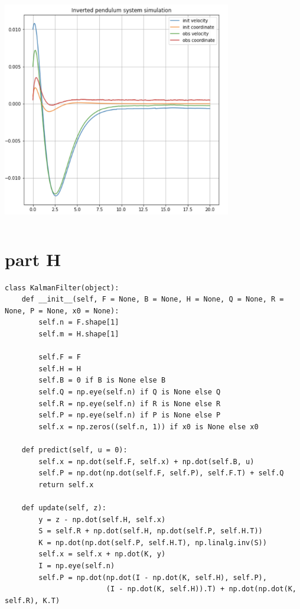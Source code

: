 \documentclass[a4paper,11pt]{article}
\makeatletter
\newcommand{\problemquestion}[1]{\gdef\@problemquestion{#1}}%
\newcommand{\problemsolution}[1]{\gdef\@problemsolution{#1}}%
\theoremstyle{mytheor}
\makeatother
\begin{document}
\includegraphics[width=10cm, height=10cm]{G.png}


\section*{part H}
\begin{problem}
  \problemquestion{implement Kalman Filter}
  \problemsolution{Prediction
  $$X^-_k = A_{k-1}X_{k-1}+B_kU_k$$
  $$P^-_k = A_{k-1}P_{k-1}A^T_{k-1}+Q_{k-1}$$
  Update
  $$V_k = Y_k-H_kX^-_k$$
  $$S_k = H_kP^-_kH^T_k+Q_{k-1}$$
  $$K_k = P^-_k H^T_kS^{-1}_k$$
  $$X_k = X^-_k + K_kV_k$$
  $$P_k = P^-_k + K_kS_kK^T_k$$
  }
\end{problem}

\begin{lstlisting}
class KalmanFilter(object):
    def __init__(self, F = None, B = None, H = None, Q = None, R = None, P = None, x0 = None):
        self.n = F.shape[1]
        self.m = H.shape[1]

        self.F = F
        self.H = H
        self.B = 0 if B is None else B
        self.Q = np.eye(self.n) if Q is None else Q
        self.R = np.eye(self.n) if R is None else R
        self.P = np.eye(self.n) if P is None else P
        self.x = np.zeros((self.n, 1)) if x0 is None else x0

    def predict(self, u = 0):
        self.x = np.dot(self.F, self.x) + np.dot(self.B, u)
        self.P = np.dot(np.dot(self.F, self.P), self.F.T) + self.Q
        return self.x

    def update(self, z):
        y = z - np.dot(self.H, self.x)
        S = self.R + np.dot(self.H, np.dot(self.P, self.H.T))
        K = np.dot(np.dot(self.P, self.H.T), np.linalg.inv(S))
        self.x = self.x + np.dot(K, y)
        I = np.eye(self.n)
        self.P = np.dot(np.dot(I - np.dot(K, self.H), self.P),  
                        (I - np.dot(K, self.H)).T) + np.dot(np.dot(K, self.R), K.T)
\end{lstlisting}{}
\end{document}

